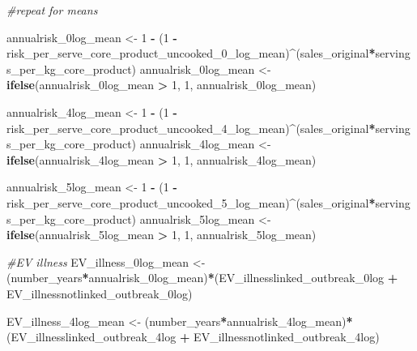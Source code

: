 \documentclass[
]{article}
\newenvironment{Shaded}{\begin{snugshade}}{\end{snugshade}}
\newcommand{\CommentTok}[1]{\textcolor[rgb]{0.56,0.35,0.01}{\textit{#1}}}
\newcommand{\DecValTok}[1]{\textcolor[rgb]{0.00,0.00,0.81}{#1}}
\newcommand{\FunctionTok}[1]{\textcolor[rgb]{0.13,0.29,0.53}{\textbf{#1}}}
\newcommand{\NormalTok}[1]{#1}
\newcommand{\OtherTok}[1]{\textcolor[rgb]{0.56,0.35,0.01}{#1}}
\newcommand{\SpecialCharTok}[1]{\textcolor[rgb]{0.81,0.36,0.00}{\textbf{#1}}}
\begin{document}
\begin{Shaded}
\begin{Highlighting}[]
\CommentTok{\#repeat for means }

\NormalTok{annualrisk\_0log\_mean }\OtherTok{\textless{}{-}} \DecValTok{1} \SpecialCharTok{{-}}\NormalTok{ (}\DecValTok{1} \SpecialCharTok{{-}}\NormalTok{ risk\_per\_serve\_core\_product\_uncooked\_0\_log\_mean)}\SpecialCharTok{\^{}}\NormalTok{(sales\_original}\SpecialCharTok{*}\NormalTok{servings\_per\_kg\_core\_product)}
\NormalTok{annualrisk\_0log\_mean }\OtherTok{\textless{}{-}} \FunctionTok{ifelse}\NormalTok{(annualrisk\_0log\_mean }\SpecialCharTok{\textgreater{}} \DecValTok{1}\NormalTok{, }\DecValTok{1}\NormalTok{, annualrisk\_0log\_mean)}

\NormalTok{annualrisk\_4log\_mean }\OtherTok{\textless{}{-}} \DecValTok{1} \SpecialCharTok{{-}}\NormalTok{ (}\DecValTok{1} \SpecialCharTok{{-}}\NormalTok{ risk\_per\_serve\_core\_product\_uncooked\_4\_log\_mean)}\SpecialCharTok{\^{}}\NormalTok{(sales\_original}\SpecialCharTok{*}\NormalTok{servings\_per\_kg\_core\_product)}
\NormalTok{annualrisk\_4log\_mean }\OtherTok{\textless{}{-}} \FunctionTok{ifelse}\NormalTok{(annualrisk\_4log\_mean }\SpecialCharTok{\textgreater{}} \DecValTok{1}\NormalTok{, }\DecValTok{1}\NormalTok{, annualrisk\_4log\_mean)}

\NormalTok{annualrisk\_5log\_mean }\OtherTok{\textless{}{-}} \DecValTok{1} \SpecialCharTok{{-}}\NormalTok{ (}\DecValTok{1} \SpecialCharTok{{-}}\NormalTok{ risk\_per\_serve\_core\_product\_uncooked\_5\_log\_mean)}\SpecialCharTok{\^{}}\NormalTok{(sales\_original}\SpecialCharTok{*}\NormalTok{servings\_per\_kg\_core\_product)}
\NormalTok{annualrisk\_5log\_mean }\OtherTok{\textless{}{-}} \FunctionTok{ifelse}\NormalTok{(annualrisk\_5log\_mean }\SpecialCharTok{\textgreater{}} \DecValTok{1}\NormalTok{, }\DecValTok{1}\NormalTok{, annualrisk\_5log\_mean)}


\CommentTok{\#EV illness}
\NormalTok{EV\_illness\_0log\_mean }\OtherTok{\textless{}{-}}\NormalTok{ (number\_years}\SpecialCharTok{*}\NormalTok{annualrisk\_0log\_mean)}\SpecialCharTok{*}\NormalTok{(EV\_illnesslinked\_outbreak\_0log }\SpecialCharTok{+}\NormalTok{ EV\_illnessnotlinked\_outbreak\_0log)}

\NormalTok{EV\_illness\_4log\_mean }\OtherTok{\textless{}{-}}\NormalTok{ (number\_years}\SpecialCharTok{*}\NormalTok{annualrisk\_4log\_mean)}\SpecialCharTok{*}\NormalTok{(EV\_illnesslinked\_outbreak\_4log }\SpecialCharTok{+}\NormalTok{ EV\_illnessnotlinked\_outbreak\_4log)}


\end{Highlighting}
\end{Shaded}
\end{document}
